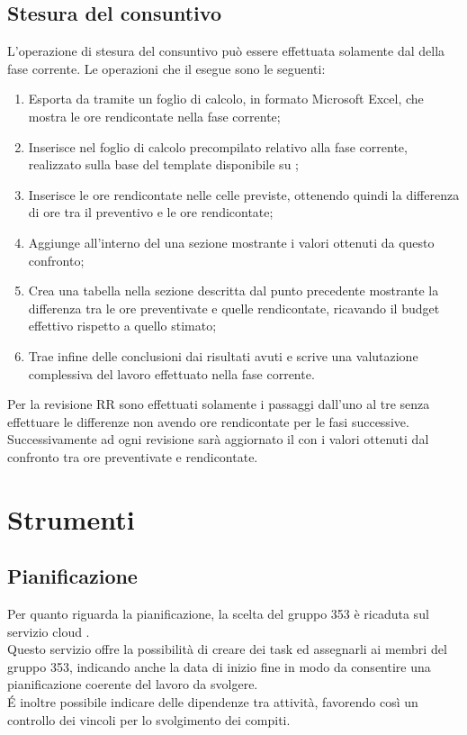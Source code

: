 \documentclass[NormeDiProgetto.tex]{subfiles}
\begin{document}
	\subsection{Stesura del consuntivo}
	L'operazione di stesura del consuntivo può essere effettuata solamente dal \respdiprog{} della fase corrente.
	Le operazioni che il \respdiprog{} esegue sono le seguenti:
	\begin{enumerate}
		\item Esporta da  tramite  un foglio di calcolo, in formato Microsoft Excel, che mostra le ore rendicontate nella fase corrente;
		\item Inserisce nel foglio di calcolo precompilato relativo alla fase corrente, realizzato sulla base del template disponibile su ;
		\item Inserisce le ore rendicontate nelle celle previste, ottenendo quindi la differenza di ore tra il preventivo e le ore rendicontate;
		\item Aggiunge all'interno del \pdp{} una sezione mostrante i valori ottenuti da questo confronto;
		\item Crea una tabella nella sezione descritta dal punto precedente mostrante la differenza tra le ore preventivate e quelle rendicontate, ricavando il budget effettivo rispetto a quello stimato;
		\item Trae infine delle conclusioni dai risultati avuti e scrive una valutazione complessiva del lavoro effettuato nella fase corrente.
	\end{enumerate}
	Per la revisione RR sono effettuati solamente i passaggi dall'uno al tre senza effettuare le differenze non avendo ore rendicontate per le fasi successive. Successivamente ad ogni revisione sarà aggiornato il \pdp{} con i valori ottenuti dal confronto tra ore preventivate e rendicontate. 
	
	\section{Strumenti}	
	\subsection{Pianificazione} Per quanto riguarda la pianificazione, la scelta del gruppo 353 è ricaduta sul servizio cloud .\\
	Questo servizio offre la possibilità di creare dei task ed assegnarli ai membri del gruppo 353, indicando anche la data di inizio fine in modo da consentire una pianificazione coerente del lavoro da svolgere.\\
	\'{E} inoltre possibile indicare delle dipendenze tra attività, favorendo così un controllo dei vincoli per lo svolgimento dei compiti.\\
\end{document}

